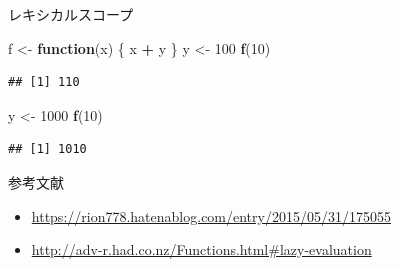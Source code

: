 \documentclass[ignorenonframetext,]{beamer}
\newenvironment{Shaded}{\begin{snugshade}}{\end{snugshade}}
\newcommand{\KeywordTok}[1]{\textcolor[rgb]{0.13,0.29,0.53}{\textbf{#1}}}
\newcommand{\DecValTok}[1]{\textcolor[rgb]{0.00,0.00,0.81}{#1}}
\newcommand{\StringTok}[1]{\textcolor[rgb]{0.31,0.60,0.02}{#1}}
\newcommand{\ControlFlowTok}[1]{\textcolor[rgb]{0.13,0.29,0.53}{\textbf{#1}}}
\newcommand{\OperatorTok}[1]{\textcolor[rgb]{0.81,0.36,0.00}{\textbf{#1}}}
\newcommand{\NormalTok}[1]{#1}
\providecommand{\tightlist}{%
  \setlength{\itemsep}{0pt}\setlength{\parskip}{0pt}}
\begin{document}
\begin{frame}[fragile]{レキシカルスコープ}

\begin{Shaded}
\begin{Highlighting}[]
\NormalTok{f <-}\StringTok{ }\ControlFlowTok{function}\NormalTok{(x) \{}
\NormalTok{  x }\OperatorTok{+}\StringTok{ }\NormalTok{y}
\NormalTok{\} }
\NormalTok{y <-}\StringTok{ }\DecValTok{100}
\KeywordTok{f}\NormalTok{(}\DecValTok{10}\NormalTok{) }
\end{Highlighting}
\end{Shaded}

\begin{verbatim}
## [1] 110
\end{verbatim}

\begin{Shaded}
\begin{Highlighting}[]
\NormalTok{y <-}\StringTok{ }\DecValTok{1000}
\KeywordTok{f}\NormalTok{(}\DecValTok{10}\NormalTok{)}
\end{Highlighting}
\end{Shaded}

\begin{verbatim}
## [1] 1010
\end{verbatim}

\end{frame}

\begin{frame}{参考文献}

\begin{itemize}
\tightlist
\item
  \url{https://rion778.hatenablog.com/entry/2015/05/31/175055}
\item
  \url{http://adv-r.had.co.nz/Functions.html\#lazy-evaluation}
\end{itemize}

\end{frame}
\end{document}
